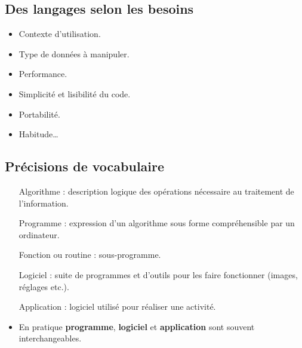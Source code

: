 \subsection{Des langages selon les besoins}
\begin{slide}
	\begin{itemize}
		\item Contexte d'utilisation.
		\item Type de données à manipuler.
		\item Performance.
		\item Simplicité et lisibilité du code.
		\item Portabilité.
		\item Habitude… 
	\end{itemize}
\end{slide}





\subsection{Précisions de vocabulaire}
\begin{slide}
	\small
	\begin{itemize}
		\small
	  \item[Algorithme] : description logique des opérations nécessaire au traitement de l'information.
		\item[Programme] : expression d'un algorithme sous forme compréhensible par un ordinateur.
		\item[Fonction ou routine] : sous-programme.
		\item[Logiciel] : suite de programmes et d'outils pour les faire fonctionner (images, réglages etc.).
		\item[Application] : logiciel utilisé pour réaliser une activité. %
		\item En pratique \textbf{programme}, \textbf{logiciel} et \textbf{application} sont souvent interchangeables.
	\end{itemize}

\end{slide}
